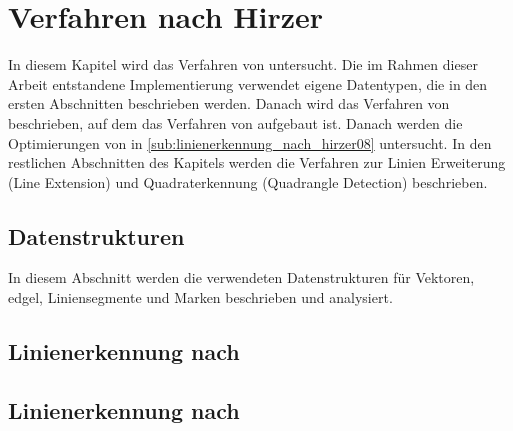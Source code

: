 \section{Verfahren nach Hirzer} %
\label{sec:hirzer}

In diesem Kapitel wird das Verfahren von \citeauthor{hirzer08} untersucht. Die im Rahmen dieser Arbeit entstandene
 Implementierung verwendet eigene Datentypen, die in den ersten Abschnitten beschrieben werden. Danach wird das
 Verfahren von \citeauthor{clarke96} beschrieben, auf dem das Verfahren von \citeauthor{hirzer08} aufgebaut ist. Danach
 werden die Optimierungen von \citeauthor{hirzer08} in \autoref{sub:linienerkennung_nach_hirzer08} untersucht. In den
 restlichen Abschnitten des Kapitels werden die Verfahren zur Linien Erweiterung (Line Extension) und Quadraterkennung
 (Quadrangle Detection) beschrieben.

\subsection{Datenstrukturen} %
\label{sub:datenstrukturen}

In diesem Abschnitt werden die verwendeten Datenstrukturen für Vektoren, \gls{edgel}, Liniensegmente und Marken
 beschrieben und analysiert.












\subsection{Linienerkennung nach \texorpdfstring{\citeauthor{clarke96}}{Clarke, Carlsson und Zisserman}} %
\label{sub:linienerkennung_nach_clarke96}


\subsection{Linienerkennung nach \texorpdfstring{\citeauthor{hirzer08}}{Hirzer}} %
\label{sub:linienerkennung_nach_hirzer08}


